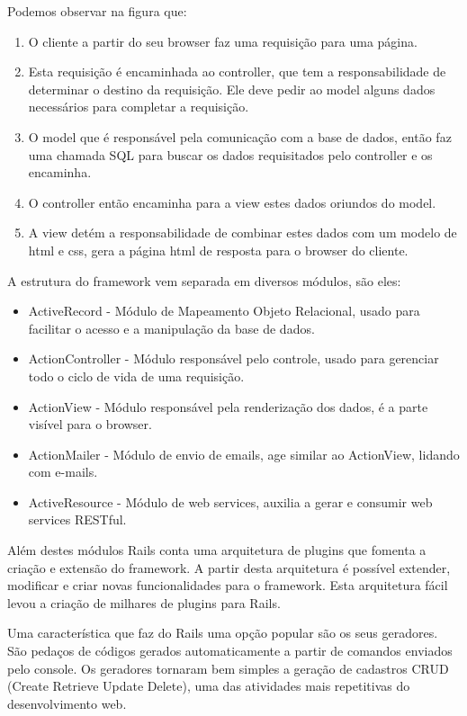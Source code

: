 Podemos observar na figura que:
\begin{enumerate}
  \item O cliente a partir do seu browser faz uma requisição para uma página.
  \item Esta requisição é encaminhada ao controller, que tem a responsabilidade de determinar o destino da requisição. Ele deve pedir ao model alguns dados necessários para completar a requisição.  
  \item O model que é responsável pela comunicação com a base de dados, então faz uma chamada SQL para buscar os dados requisitados pelo controller e os encaminha.
  \item O controller então encaminha para a view estes dados oriundos do model.
  \item A view detém a responsabilidade de combinar estes dados com um modelo de html e css, gera a página html de resposta para o browser do cliente.
\end{enumerate}


A estrutura do framework vem separada em diversos módulos, são eles:

\begin{itemize}
  \item ActiveRecord - Módulo de Mapeamento Objeto Relacional, usado para facilitar o acesso e a manipulação da base de dados. 
  \item ActionController - Módulo responsável pelo controle, usado para gerenciar todo o ciclo de vida de uma requisição. 
  \item ActionView - Módulo responsável pela renderização dos dados, é a parte visível para o browser. 
  \item ActionMailer - Módulo de envio de emails, age similar ao ActionView, lidando com e-mails. 
  \item ActiveResource - Módulo de web services, auxilia a gerar e consumir web services RESTful. 
\end{itemize}

Além destes módulos Rails conta uma arquitetura de plugins que fomenta a criação e extensão do framework. A partir desta arquitetura é possível extender, modificar e criar novas funcionalidades para o framework. Esta arquitetura fácil levou a criação de milhares de plugins para Rails.

Uma característica que faz do Rails uma opção popular são os seus geradores. São pedaços de códigos gerados automaticamente a partir de comandos enviados pelo console. Os geradores tornaram bem simples a geração de cadastros CRUD (Create Retrieve Update Delete), uma das atividades mais repetitivas do desenvolvimento web.





